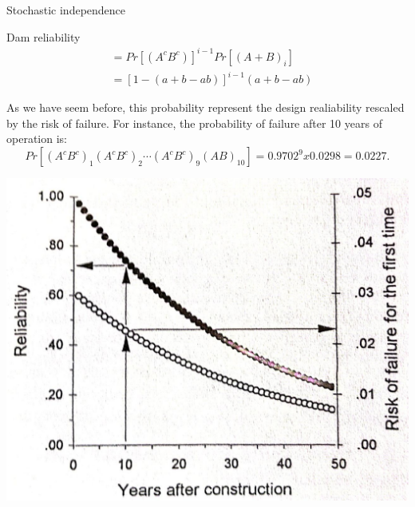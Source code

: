 \documentclass[8pt]{beamer}
\begin{document}
\begin{frame}{Stochastic independence}
\begin{exampleblock}{Dam reliability}
\begin{align*}
                                                                          &= Pr[(A^c B^c)]^{i-1} Pr[(A + B)_i] \\
                                                                          &= [1 - (a + b - ab)]^{i-1} (a + b - ab)
        \end{align*}
        \vspace{-5pt}
     \end{exampleblock}
        \vspace{-15pt}
        \begin{minipage}{0.7\textwidth}
   As we have seem before, this probability represent the design realiability rescaled by the risk of failure. For instance, the probability of failure after 10 years of operation is:
    $$
    Pr[(A^c B^c)_1 (A^c B^c)_2 \cdots (A^c B^c)_{9} (AB)_{10} ] = 0.9702^9 x 0.0298 = 0.0227.  
    $$
        \end{minipage}
        \hfill
        \begin{minipage}{0.3\textwidth}
            \includegraphics[width=\linewidth]{fi224.jpeg}
        \end{minipage}
\end{frame}
\end{document}
